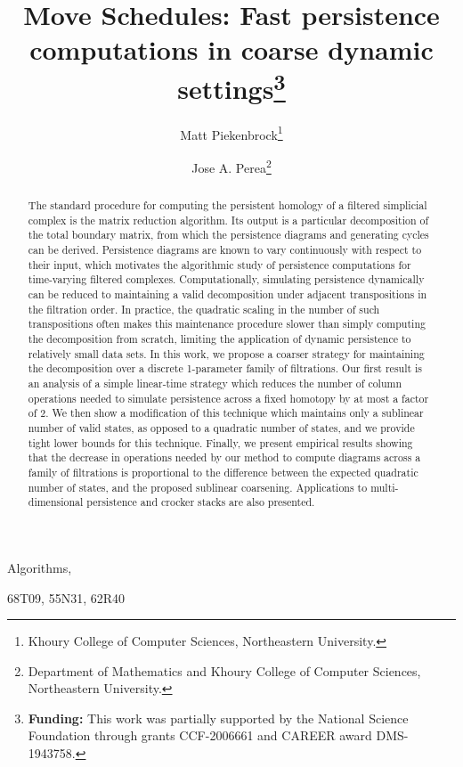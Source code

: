 \documentclass{siamart190516}
\title{Move Schedules: Fast persistence computations in coarse dynamic settings\thanks{\textbf{Funding:} This work was partially supported by the National Science Foundation through grants CCF-2006661 and CAREER award DMS-1943758.}
}
\author{
	Matt Piekenbrock\thanks{Khoury College of Computer Sciences, Northeastern University.}
	\and Jose A. Perea\thanks{
	Department of Mathematics and Khoury College of Computer Sciences, Northeastern University.}
}
\begin{document}
 
\maketitle

\begin{abstract}
	The standard procedure for computing the persistent homology of a filtered simplicial complex is the matrix reduction algorithm. Its output is a particular decomposition of the total boundary matrix, from which the persistence diagrams and generating cycles can be derived. 
	Persistence diagrams are known to vary continuously with respect to their input, which motivates the algorithmic study of persistence computations for time-varying filtered complexes. Computationally, simulating persistence dynamically can be reduced to maintaining a valid decomposition under adjacent transpositions in the filtration order. 
	In practice, the quadratic scaling in the number of  such transpositions often makes this maintenance procedure slower than simply computing the decomposition from scratch,  limiting the application of dynamic persistence to relatively small data sets. In this work, we propose a coarser strategy for maintaining the decomposition over a discrete 1-parameter family of filtrations. Our first result is an analysis of a simple linear-time strategy which reduces the number of column operations needed to simulate persistence across a fixed homotopy by at most a factor of 2. We then show a modification of this technique which maintains only a sublinear number of valid states, as opposed to a quadratic number of states, and we provide tight lower bounds for this technique.
	Finally, we present empirical results showing that the decrease in operations needed by our method to compute diagrams across a family of filtrations is proportional to the difference between the expected quadratic number of states, and the proposed sublinear coarsening.
	Applications to multi-dimensional persistence and crocker stacks are also presented. 
\end{abstract}


\begin{keywords}
  Algorithms, 
\end{keywords}

\begin{AMS}
  68T09, 55N31, 62R40
\end{AMS}
\end{document}
